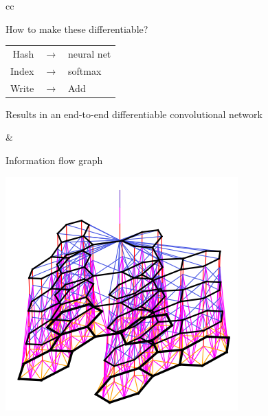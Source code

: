 \documentclass[landscape,a0b,final,a4resizeable]{include/a0poster}
\begin{document}
\begin{poster}
\begin{multicols}{3}
\newpage %



\vspace{0.5in}

\begin{tabular}{cc}
\begin{minipage}[c]{0.5\columnwidth}

How to make these differentiable?

\begin{center}
\begin{tabular}{rcl}
Hash  & $\rightarrow$ & neural net \\
Index & $\rightarrow$ & softmax \\
Write & $\rightarrow$ & Add
\end{tabular}
\end{center}

Results in an end-to-end differentiable convolutional network

\end{minipage} & 
\begin{minipage}[c]{0.4\columnwidth}
\begin{center}
Information flow graph

\hspace{-1em}\centerline{\includegraphics[width=\columnwidth, clip, trim=4mm 12mm 4mm 4mm]{figures/3d-nets/net1.png}}
\end{center}


\end{minipage}
\end{tabular}
\end{multicols}
\end{poster}
\end{document}
